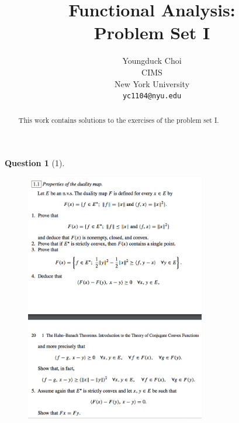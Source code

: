 \documentclass{article} %
\title{Functional Analysis: \\
Problem Set I}
\author{
Youngduck Choi \\
CIMS \\
New York University\\
\texttt{yc1104@nyu.edu} \\
}
\theoremstyle{quest}
\newtheorem*{question}{Question}
\begin{document}
\maketitle

\begin{abstract}
This work contains solutions to the exercises of the problem set I.
\end{abstract}

\bigskip

\begin{question}[1]
\hfill
\begin{figure}[h!]
  \centering
    \includegraphics[width=0.7\textwidth]{funcA-1-1.png}
\end{figure}
\end{question}
\end{document}
